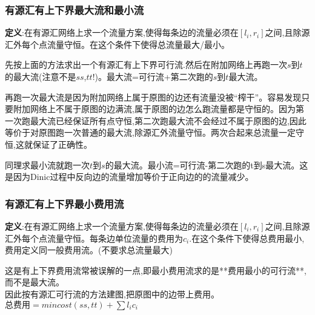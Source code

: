 \documentclass[12pt, a4paper, oneside]{ctexart}
\begin{document}
\subsubsection{有源汇有上下界最大流和最小流}
\textbf{定义}:在有源汇网络上求一个流量方案,使得每条边的流量必须在$[l_{i},r_{i}]$之间,且除源汇外每个点流量守恒。在这个条件下使得总流量最大/最小。\par
先按上面的方法求出一个有源汇有上下界可行流.然后在附加网络上再跑一次$s$到$t$的最大流(注意不是$ss$,$tt$!)。最大流=可行流+第二次跑的$s$到$t$最大流。\par
再跑一次最大流是因为附加网络上属于原图的边还有流量没被“榨干”。容易发现只要附加网络上不属于原图的边满流,属于原图的边怎么跑流量都是守恒的。因为第一次跑最大流已经保证所有点守恒,第二次跑最大流不会经过不属于原图的边,因此等价于对原图跑一次普通的最大流,除源汇外流量守恒。两次合起来总流量一定守恒,这就保证了正确性。\par
同理求最小流就跑一次$t$到$s$的最大流。最小流=可行流-第二次跑的t到s最大流。这是因为Dinic过程中反向边的流量增加等价于正向边的的流量减少。

\subsubsection{有源汇有上下界最小费用流}
\textbf{定义}:在有源汇网络上求一个流量方案,使得每条边的流量必须在$[l_{i},r_{i}]$之间,且除源汇外每个点流量守恒。每条边单位流量的费用为$c_{i}$.在这个条件下使得总费用最小,费用定义同一般费用流。(不要求总流量最大)\par
这是有上下界费用流常被误解的一点,即最小费用流求的是**费用最小的可行流**,而不是最大流。\\

因此按有源汇可行流的方法建图,把原图中的边带上费用。$总费用=mincost(ss,tt)+\sum{l_{i}c_{i}}$
\end{document}

